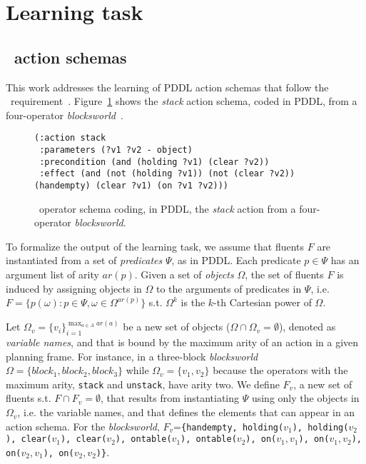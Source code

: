 
\section{Learning task}
\label{learning_task}


\subsection{\strips\ action schemas}
This work addresses the learning of PDDL action schemas that follow the \strips\ requirement~\cite{mcdermott1998pddl,fox2003pddl2}. Figure~\ref{fig:stack} shows the {\em stack} action schema, coded in PDDL, from a four-operator {\em blocksworld}~\cite{slaney2001blocks}.

\begin{figure}[hbt!]
\begin{footnotesize}
\begin{verbatim}
(:action stack
 :parameters (?v1 ?v2 - object)
 :precondition (and (holding ?v1) (clear ?v2))
 :effect (and (not (holding ?v1)) (not (clear ?v2)) (handempty) (clear ?v1) (on ?v1 ?v2)))
\end{verbatim}
\end{footnotesize}
 \caption{\small \strips\ operator schema coding, in PDDL, the {\em stack} action from a four-operator {\em blocksworld}.}
\label{fig:stack}
\end{figure}

To formalize the output of the learning task, we assume that fluents $F$ are instantiated from a set of {\em predicates} $\Psi$, as in PDDL. Each predicate $p\in\Psi$ has an argument list of arity $ar(p)$. Given a set of {\em objects} $\Omega$, the set of fluents $F$ is induced by assigning objects in $\Omega$ to the arguments of predicates in $\Psi$, i.e.~$F=\{p(\omega):p\in\Psi,\omega\in\Omega^{ar(p)}\}$ s.t. $\Omega^k$ is the $k$-th Cartesian power of $\Omega$.

Let $\Omega_v=\{v_i\}_{i=1}^{\operatorname*{max}_{a\in A} ar(a)}$ be a new set of objects ($\Omega\cap\Omega_v=\emptyset$), denoted as {\em variable names}, and that is bound by the maximum arity of an action in a given planning frame. For instance, in a three-block {\em blocksworld} $\Omega=\{block_1, block_2, block_3\}$ while $\Omega_v=\{v_1, v_2\}$ because the operators with the maximum arity, {\small\tt stack} and {\small\tt unstack}, have arity two. We define $F_v$, a new set of fluents s.t. $F\cap F_v=\emptyset$, that results from instantiating $\Psi$ using only the objects in $\Omega_v$, i.e. the variable names, and that defines the elements that can appear in an action schema. For the {\em blocksworld}, $F_v$={\small\tt\{handempty, holding($v_1$), holding($v_2$), clear($v_1$), clear($v_2$), ontable($v_1$), ontable($v_2$), on($v_1,v_1$), on($v_1,v_2$), on($v_2,v_1$), on($v_2,v_2$)\}}.

